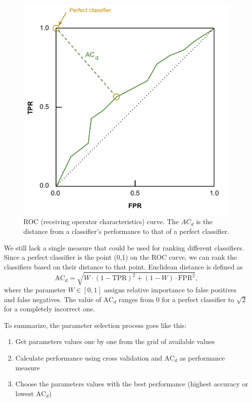 \begin{figure}[here]
\centering
\includegraphics[scale=0.7]{images/roc.pdf}
\caption{ROC (receiving operator characteristics) curve. The $AC_d$ is the distance from a classifier's performance to that of a perfect classifier.}
\label{fig:roc}
\end{figure}

We still lack a single measure that could be used for ranking different classifiers. Since a perfect classifier is the point (0,1) on the ROC curve, we can rank the classifiers based on their distance to that point. Euclidean distance is defined as
\begin{equation}
\text{AC}_d = \sqrt{W \cdot (1 - \text{TPR})^2 + (1 - W) \cdot \text{FPR}^2}, \label{eq:acd}
\end{equation}
where the parameter $W \in [0,1]$ assigns relative importance to false positives and false negatives. The value of $\text{AC}_d$ ranges from 0 for a perfect classifier to $\sqrt{2}$ for a completely incorrect one. \cite{Hamilton12}

To summarize, the parameter selection process goes like this:
\begin{enumerate}
\item{Get parameters values one by one from the grid of available values}
\item{Calculate performance using cross validation and $\text{AC}_d$ as performance measure}
\item{Choose the parameters values with the best performance (highest accuracy or lowest $\text{AC}_d$)}
\end{enumerate}

